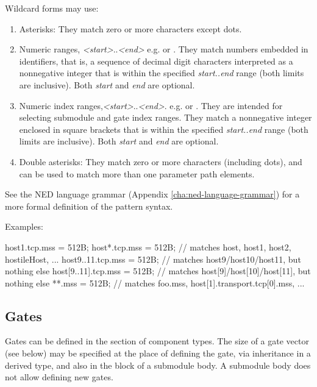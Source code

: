 Wildcard forms may use:
\begin{enumerate}
  \item Asterisks: They match zero or more characters except dots.
  \item Numeric ranges, \ttt{\{}\textit{<start>}..\textit{<end>}\ttt{\}}
    e.g.  or . They match numbers embedded
    in identifiers, that is, a sequence of decimal digit characters interpreted as a
    nonnegative integer that is within the specified \textit{start..end}
    range (both limits are inclusive). Both \textit{start} and \textit{end}
    are optional.
  \item Numeric index ranges,\ttt{[}\textit{<start>}..\textit{<end>}\ttt{]}.
    e.g. \ttt{[5..120]} or \ttt{[..10]}. They are intended for selecting
    submodule and gate index ranges. They match a nonnegative integer
    enclosed in square brackets that is within the specified
    \textit{start..end} range (both limits are inclusive).
    Both \textit{start} and \textit{end} are optional.
  \item Double asterisks: They match zero or more characters (including dots),
    and can be used to match more than one parameter path elements.
\end{enumerate}

See the NED language grammar (Appendix \ref{cha:ned-language-grammar})
for a more formal definition of the pattern syntax.

Examples:
\begin{ned}
host1.tcp.mss = 512B;
host*.tcp.mss = 512B; // matches host, host1, host2, hostileHost, ...
host{9..11}.tcp.mss = 512B; // matches host9/host10/host11, but nothing else
host[9..11].tcp.mss = 512B; // matches host[9]/host[10]/host[11], but nothing else
**.mss = 512B; // matches foo.mss, host[1].transport.tcp[0].mss, ...
\end{ned}



\subsection{Gates}
\label{sec:ned-ref:gates}

Gates can be defined in the  section of component types.
The size of a gate vector (see below) may be specified at the place of
defining the gate, via inheritance in a derived type, and also in the
 block of a submodule body. A submodule body does not allow
defining new gates.

